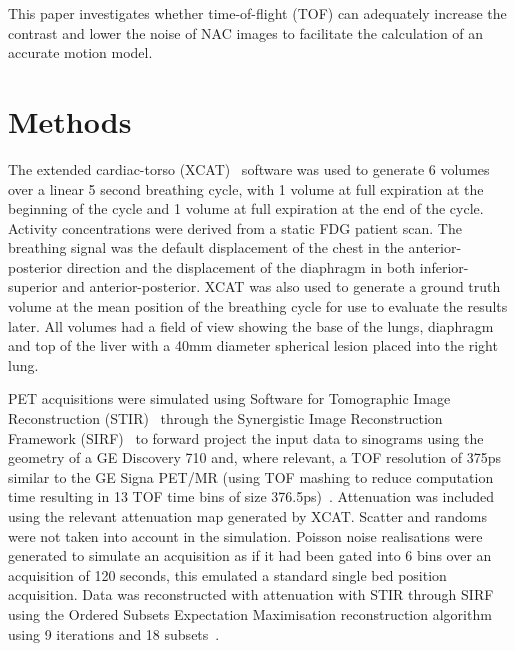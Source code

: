 \documentclass[9pt]{IEEEtran}
\begin{document}

This paper investigates whether time-of-flight (TOF) can adequately increase the contrast and lower the noise of  NAC images to facilitate the calculation of an accurate motion model.

\section{Methods}
The extended cardiac-torso (XCAT)~\cite{Segars2009} software was used to generate 6 volumes over a linear 5 second breathing cycle, with 1 volume at full expiration at the beginning of the cycle and 1 volume at full expiration at the end of the cycle. Activity concentrations were derived from a static FDG patient scan. The breathing signal was the default displacement of the chest in the anterior-posterior direction and the displacement of the diaphragm in both inferior-superior and anterior-posterior. XCAT was also used to generate a ground truth volume at the mean position of the breathing cycle for use to evaluate the results later. All volumes had a field of view showing the base of the lungs, diaphragm and top of the liver with a 40mm diameter spherical lesion placed into the right lung.

PET acquisitions were simulated using Software for Tomographic Image Reconstruction (STIR)~\cite{Thielemans2012} through the Synergistic Image Reconstruction Framework (SIRF)~\cite{Ovtchinnikov2017} to forward project the input data to sinograms using the geometry of a GE Discovery 710 and, where relevant, a TOF resolution of 375ps similar to the GE Signa PET/MR (using TOF mashing to reduce computation time resulting in 13 TOF time bins of size 376.5ps)~\cite{Efthimiou2017}. Attenuation was included using the relevant attenuation map generated by XCAT. Scatter and randoms were not taken into account in the simulation.
Poisson noise realisations were generated to simulate an acquisition as if it had been gated into 6 bins over an acquisition of 120 seconds, this emulated a standard single bed position acquisition.
Data was reconstructed with attenuation with STIR through SIRF using the Ordered Subsets Expectation Maximisation reconstruction algorithm using 9 iterations and 18 subsets~\cite{Hudson1994}. 
\end{document}
